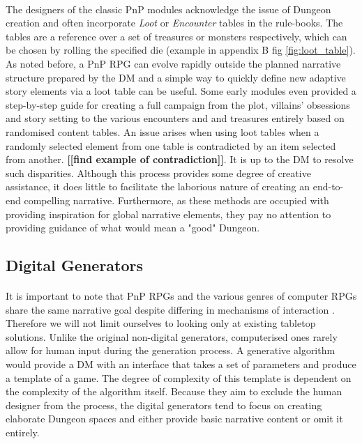 \documentclass{UoYCSproject}
\begin{document}
\paragraph{}
The designers of the classic PnP modules acknowledge the issue of Dungeon creation and often incorporate \textit{Loot} or \textit{Encounter} tables in the rule-books. The tables are a reference over a set of treasures or monsters respectively, which can be chosen by rolling the specified die (example in appendix B fig \ref{fig:loot_table}). As noted before, a PnP RPG can evolve rapidly outside the planned narrative structure prepared by the DM and a simple way to quickly define new adaptive story elements via a loot table can be useful. Some early modules even provided a step-by-step guide for creating a full campaign from the plot, villains' obsessions and story setting to the various encounters and and treasures \parencite{ADnD} entirely based on randomised content tables. An issue arises when using loot tables when a randomly selected element from one table is contradicted by an item selected from another. \textbf{[[find example of contradiction]]}. It is up to the DM to resolve such disparities. Although this process provides some degree of creative assistance, it does little to facilitate the laborious nature of creating an end-to-end compelling narrative. Furthermore, as these methods are occupied with providing inspiration for global narrative elements, they pay no attention to providing guidance of what would mean a "good" Dungeon.

\subsection{Digital Generators}
\label{subsec:DigGen}
\paragraph{}
It is important to note that PnP RPGs and the various genres of computer RPGs share the same narrative goal despite differing in mechanisms of interaction \parencite{Tychsen2006}. Therefore we will not limit ourselves to looking only at existing tabletop solutions.
Unlike the original non-digital generators, computerised ones rarely allow for human input during the generation process. A generative algorithm would provide a DM with an interface that takes a set of parameters and produce a template of a game. The degree of complexity of this template is dependent on the complexity of the algorithm itself. Because they aim to exclude the human designer from the process, the digital generators tend to focus on creating elaborate Dungeon spaces and either provide basic narrative content or omit it entirely.
\end{document}
